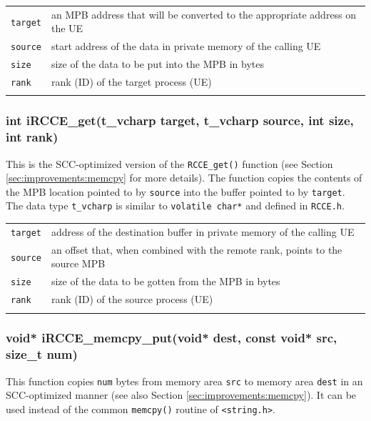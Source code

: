 \documentclass[fontsize=10pt, paper=a4, DIV12, pagesize=auto]{scrartcl}
\begin{document}
\begin{tabular}{ll}
\texttt{target} & an MPB address that will be converted to the appropriate address on the UE \\
\texttt{source} & start address of the data in private memory of the calling UE \\
\texttt{size}   & size of the data to be put into the MPB in bytes \\
\texttt{rank}   & rank (ID) of the target process (UE) \\
\hspace{2.0cm}
\end{tabular}

\subsubsection{int iRCCE\_get(t\_vcharp target, t\_vcharp source, int size, int rank)}\vspace{-0.3cm}
This is the SCC-optimized version of the \texttt{RCCE\_get()} function (see Section \ref{sec:improvements:memcpy} for more details).
The function copies the contents of the MPB location pointed to by \texttt{source} into the buffer pointed to by \texttt{target}.
The data type \texttt{t\_vcharp} is similar to \texttt{volatile char*} and defined in \texttt{RCCE.h}.

\begin{tabular}{ll}
\texttt{target} & address of the destination buffer in private memory of the calling UE \\
\texttt{source} & an offset that, when combined with the remote rank, points to the source MPB\\
\texttt{size}   & size of the data to be gotten from the MPB in bytes \\
\texttt{rank}   & rank (ID) of the source process (UE) \\
\hspace{2.0cm}
\end{tabular}


\subsubsection{void* iRCCE\_memcpy\_put(void* dest, const void* src, size\_t num)}\vspace{-0.3cm}
This function copies \texttt{num} bytes from memory area \texttt{src} to memory area \texttt{dest} in an SCC-optimized manner (see also Section \ref{sec:improvements:memcpy}).
It can be used instead of the common \texttt{memcpy()} routine of \texttt{<string.h>}.
\end{document}
